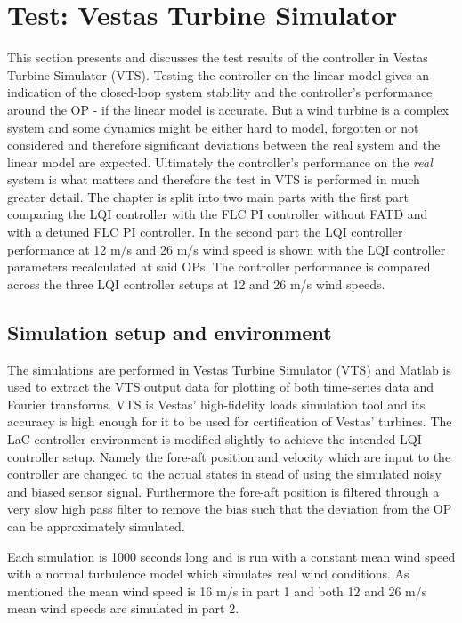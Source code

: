 \section{Test: Vestas Turbine Simulator} \label{sec:test_vts}
This section presents and discusses the test results of the controller in Vestas Turbine Simulator (VTS). Testing the controller on the linear model gives an indication of the closed-loop system stability and the controller's performance around the OP - if the linear model is accurate. But a wind turbine is a complex system and some dynamics might be either hard to model, forgotten or not considered and therefore significant deviations between the real system and the linear model are expected. Ultimately the controller's performance on the \textit{real} system is what matters and therefore the test in VTS is performed in much greater detail. The chapter is split into two main parts with the first part comparing the LQI controller with the FLC PI controller without FATD and with a detuned FLC PI controller. In the second part the LQI controller performance at 12 m/s and 26 m/s wind speed is shown with the LQI controller parameters recalculated at said OPs. The controller performance is compared across the three LQI controller setups at 12 and 26 m/s wind speeds.

\subsection{Simulation setup and environment}
The simulations are performed in Vestas Turbine Simulator (VTS) and Matlab is used to extract the VTS output data for plotting of both time-series data and Fourier transforms. VTS is Vestas' high-fidelity loads simulation tool and its accuracy is high enough for it to be used for certification of Vestas' turbines.  The LaC controller environment is modified slightly to achieve the intended LQI controller setup. Namely the fore-aft position and velocity which are input to the controller are changed to the actual states in stead of using the simulated noisy and biased sensor signal. Furthermore the fore-aft position is filtered through a very slow high pass filter to remove the bias such that the deviation from the OP can be approximately simulated.

\smallskip
Each simulation is 1000 seconds long and is run with a constant mean wind speed with a normal turbulence model which simulates real wind conditions. As mentioned the mean wind speed is 16 m/s in part 1 and both 12 and 26 m/s mean wind speeds are simulated in part 2.


